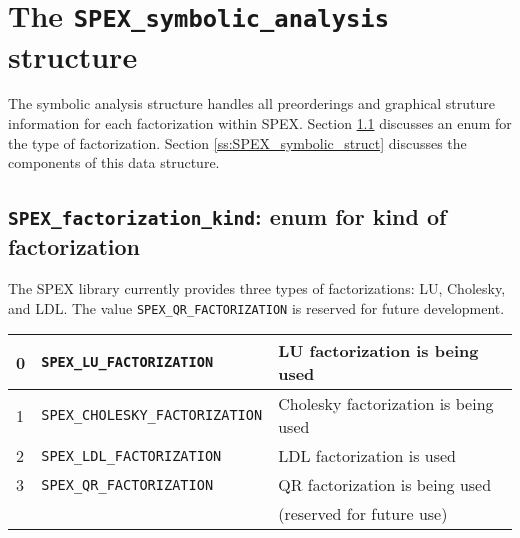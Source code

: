 \documentclass[12pt,oneside]{book}
\theoremstyle{definition}
\newenvironment{SizedCenteredTabular}[2][\small]
    {   
        #1\begin{center}\begin{tabular}{#2}
    }{ 
        \end{tabular}\end{center}
    }
\begin{document}
\section{The \texttt{SPEX\_symbolic\_analysis} structure} \label{s:spex_symbolic_analysis}
The symbolic analysis structure handles all preorderings and graphical struture information for each factorization within SPEX. Section \ref{ss:spex_factorization_kind} discusses an enum for the type of factorization. Section \ref{ss:SPEX_symbolic_struct} discusses the components of this data structure.


\subsection{\texttt{SPEX\_factorization\_kind}: enum for kind of factorization} \label{ss:spex_factorization_kind}

The SPEX library currently provides three types of factorizations: LU, Cholesky, and LDL. The value
\verb|SPEX_QR_FACTORIZATION| is reserved for future development.

\begin{SizedCenteredTabular}{lll} \hline
0 & \verb|SPEX_LU_FACTORIZATION|       & LU factorization is being used \\ \hline
1 & \verb|SPEX_CHOLESKY_FACTORIZATION| & Cholesky factorization is being used\\ \hline
2 & \verb|SPEX_LDL_FACTORIZATION|      & LDL factorization is used \\ \hline
3 & \verb|SPEX_QR_FACTORIZATION|       & QR factorization is being used \\ 
  &                                    & (reserved for future use)\\ \hline
\end{SizedCenteredTabular}
\end{document}
